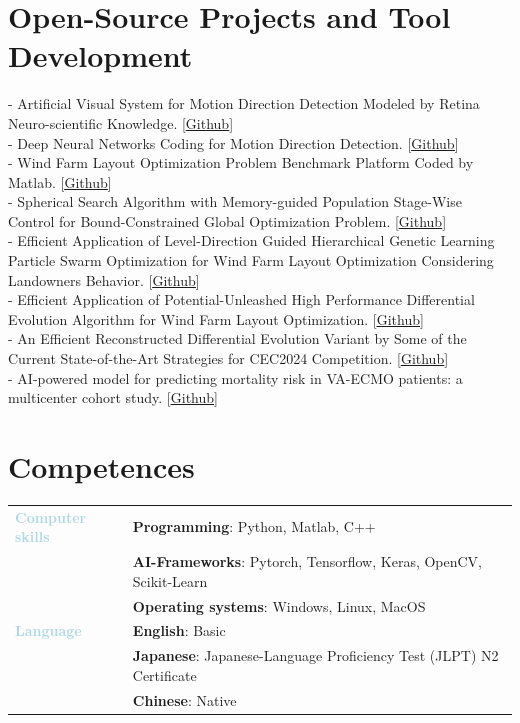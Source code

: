 \documentclass[11pt,a4paper,sans]{moderncv}
\renewcommand{\underline}[1]{\uline{#1}}
\begin{document}
{\section{Open-Source Projects and Tool Development}
- Artificial Visual System for Motion Direction Detection Modeled by Retina Neuro-scientific Knowledge. {\color{black}[\href{https://github.com/SichenTao}{\underline{Github}}]}\\
- Deep Neural Networks Coding for Motion Direction Detection. {\color{black}[\href{https://github.com/SichenTao}{\underline{Github}}]} \\
- Wind Farm Layout Optimization Problem Benchmark Platform Coded by Matlab. {\color{black}[\href{https://github.com/SichenTao}{\underline{Github}}]} \\
- Spherical Search Algorithm with Memory-guided Population Stage-Wise Control for Bound-Constrained Global Optimization Problem. {\color{black}[\href{https://github.com/SichenTao}{\underline{Github}}]} \\
- Efficient Application of Level-Direction Guided Hierarchical Genetic Learning Particle Swarm Optimization for Wind Farm Layout Optimization Considering Landowners Behavior. {\color{black}[\href{https://github.com/SichenTao}{\underline{Github}}]} \\
- Efficient Application of Potential-Unleashed High Performance Differential Evolution Algorithm for Wind Farm Layout Optimization. {\color{black}[\href{https://github.com/SichenTao}{\underline{Github}}]} \\
- An Efficient Reconstructed Differential Evolution Variant by Some of the Current State-of-the-Art Strategies for CEC2024 Competition. {\color{black}[\href{https://github.com/SichenTao}{\underline{Github}}]} \\
- AI-powered model for predicting mortality risk in VA-ECMO patients: a multicenter cohort study. {\color{black}[\href{https://github.com/SichenTao}{\underline{Github}}]}


\section{Competences}
\begin{tabular}{>{\raggedright}p{5cm} p{15cm}}
\textbf{\textcolor{lightblue}{Computer skills}} & \textbf{Programming}: Python, Matlab, C++ \\
 & \textbf{AI-Frameworks}: Pytorch, Tensorflow, Keras, OpenCV, Scikit-Learn \\ 
 & \textbf{Operating systems}: Windows, Linux, MacOS \\
\textbf{\textcolor{lightblue}{Language}} & \textbf{English}: Basic \\
& \textbf{Japanese}: Japanese-Language Proficiency Test (JLPT) N2 Certificate \\
& \textbf{Chinese}: Native
\end{tabular}

}
\end{document}
